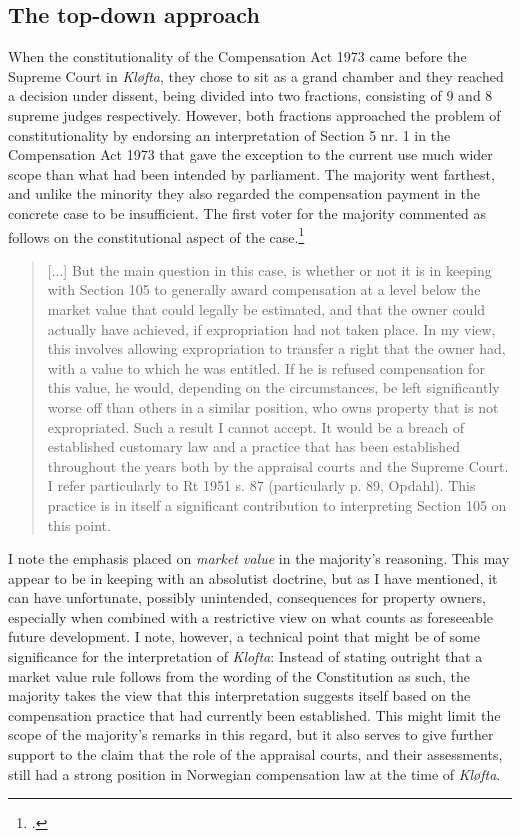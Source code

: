 \subsection{The top-down approach}\label{sec:regab}

When the constitutionality of the Compensation Act 1973 came before the Supreme Court in \emph{Kløfta}, they chose to sit as a grand chamber and they reached a decision under dissent, being divided into two fractions, consisting of 9 and 8 supreme judges respectively. However, both fractions approached the problem of constitutionality by endorsing an interpretation of Section 5 nr. 1 in the Compensation Act 1973 that gave the exception to the current use much wider scope than what had been intended by parliament. The majority went farthest, and unlike the minority they also regarded the compensation payment in the concrete case to be insufficient. The first voter for the majority commented as follows on the constitutional aspect of the case.\footcite[7-8]{klofta76}

\begin{quote}
[...] But the main question in this case, is whether or not it is in keeping with Section 105 to generally award compensation at a level below the market value that could legally be estimated, and that the owner could actually have achieved, if expropriation had not taken place. In my view, this involves allowing expropriation to transfer a right that the owner had, with a value to which he was entitled. If he is refused compensation for this value, he would, depending on the circumstances, be left significantly worse off than others in a similar position, who owns property that is not expropriated. Such a result I cannot accept. It would be a breach of established customary law and a practice that has been established throughout the years both by the appraisal courts and the Supreme Court. I refer particularly to Rt 1951 s. 87 (particularly p. 89, Opdahl). This practice is in itself a significant contribution to interpreting Section 105 on this point.
\end{quote}

I note the emphasis placed on \emph{market value} in the majority's reasoning. This may appear to be in keeping with an absolutist doctrine, but as I have mentioned, it can have unfortunate, possibly unintended, consequences for property owners, especially when combined with a restrictive view on what counts as foreseeable future development. I note, however, a technical point that might be of some significance for the interpretation of \emph{Klofta}: Instead of stating outright that a market value rule follows from the wording of the Constitution as such, the majority takes the view that this interpretation suggests itself based on the compensation practice that had currently been established. This might limit the scope of the majority's remarks in this regard, but it also serves to give further support to the claim that the role of the appraisal courts, and their assessments, still had a strong position in Norwegian compensation law at the time of \emph{Kløfta}. 

